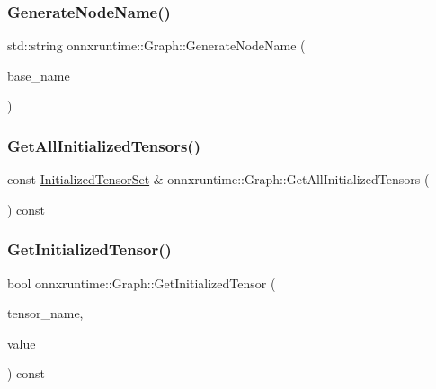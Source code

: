 \mbox{\label{classonnxruntime_1_1Graph_ab9b804ad292ab80434def67fd8d6c436}} 
\subsubsection{\texorpdfstring{Generate\+Node\+Name()}{GenerateNodeName()}}
{\footnotesize\ttfamily std\+::string onnxruntime\+::\+Graph\+::\+Generate\+Node\+Name (\begin{DoxyParamCaption}\item[{const std\+::string \&}]{base\+\_\+name }\end{DoxyParamCaption})}

\mbox{\label{classonnxruntime_1_1Graph_a1c73d249e30812794524d1791048d8f1}} 
\subsubsection{\texorpdfstring{Get\+All\+Initialized\+Tensors()}{GetAllInitializedTensors()}}
{\footnotesize\ttfamily const \mbox{\hyperlink{namespaceonnxruntime_a80c06ce917adca79f4a9c0f9ad3147f8}{Initialized\+Tensor\+Set}} \& onnxruntime\+::\+Graph\+::\+Get\+All\+Initialized\+Tensors (\begin{DoxyParamCaption}{ }\end{DoxyParamCaption}) const\hspace{0.3cm}{\ttfamily [noexcept]}}

\mbox{\label{classonnxruntime_1_1Graph_ae0637d52edb20ae9a2700a29eb931e9c}} 
\subsubsection{\texorpdfstring{Get\+Initialized\+Tensor()}{GetInitializedTensor()}}
{\footnotesize\ttfamily bool onnxruntime\+::\+Graph\+::\+Get\+Initialized\+Tensor (\begin{DoxyParamCaption}\item[{const std\+::string \&}]{tensor\+\_\+name,  }\item[{const O\+N\+N\+X\+\_\+\+N\+A\+M\+E\+S\+P\+A\+C\+E\+::\+Tensor\+Proto $\ast$\&}]{value }\end{DoxyParamCaption}) const}

